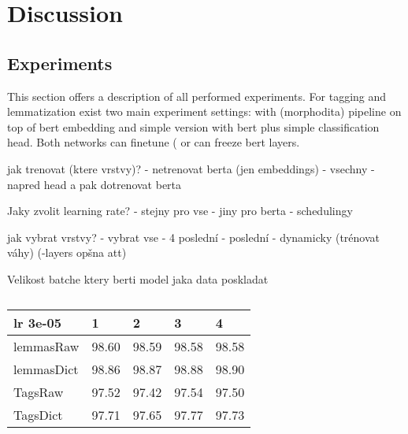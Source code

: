 \chapter{Discussion}
\label{chap:diss}


 
\section{Experiments}
This section offers a description of all performed experiments.
For tagging and lemmatization exist two main experiment settings: with (morphodita) pipeline on top of bert embedding and simple version with bert plus simple classification head. Both networks can finetune ( %
or can freeze bert layers.

jak trenovat (ktere vrstvy)?
- netrenovat berta (jen embeddings)
- vsechny
- napred head a pak dotrenovat berta

Jaky zvolit learning rate?
- stejny pro vse
- jiny pro berta
- schedulingy

jak vybrat vrstvy?
- vybrat vse
- 4 poslední
- poslední
- dynamicky (trénovat váhy) (-layers opšna att)

Velikost batche
ktery berti model
jaka data poskladat


 














\begin{table}
\centering
\caption{}
\begin{tabular}{l|llll}
\multicolumn{1}{l}{\textbf{lr 3e-05}} & 1     & 2      & 3     & 4      \\ 
\hline\hline
lemmasRaw                    & 98.60 & 98.59  & 98.58 & 98.58  \\ 
\hline
lemmasDict                   & 98.86 & 98.87  & 98.88 & 98.90  \\ 
\hline
TagsRaw                      & 97.52 & 97.42 & 97.54 & 97.50  \\ 
\hline
TagsDict                     & 97.71 & 97.65  & 97.77 & 97.73  \\
\hline
\end{tabular}
\end{table}

